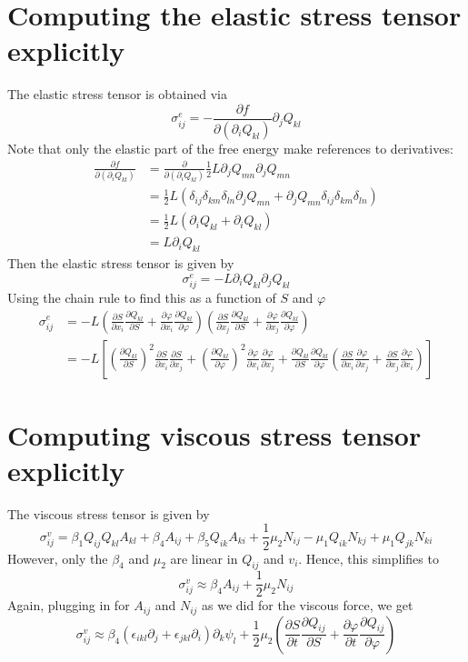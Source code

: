 \documentclass[leqno]{article}
\begin{document}
	\section*{Computing the elastic stress tensor explicitly}
	The elastic stress tensor is obtained via
	\[
		\sigma^{e}_{ij} = -\frac{\partial f}{\partial (\partial_i Q_{kl})} \partial_j Q_{kl}
	\]
	Note that only the elastic part of the free energy make references to derivatives:
	\begin{align*}
		\frac{\partial f}{\partial (\partial_i Q_{kl})} &= \frac{\partial}{\partial (\partial_i Q_{kl})} \frac{1}{2} L \partial_j Q_{mn} \partial_j Q_{mn} \\
		&= \frac{1}{2} L (\delta_{ij}\delta_{km}\delta_{ln} \partial_j Q_{mn} + \partial_j Q_{mn} \delta_{ij}\delta_{km}\delta_{ln}) \\
		&= \frac{1}{2} L (\partial_i Q_{kl} + \partial_i Q_{kl}) \\
		&= L\partial_i Q_{kl}
	\end{align*}
	Then the elastic stress tensor is given by
	\[
		\sigma^e_{ij} = -L\partial_i Q_{kl} \partial_j Q_{kl}
	\]
	Using the chain rule to find this as a function of $S$ and $\varphi$
	\begin{align*}
		\sigma^e_{ij} &= -L \left( \frac{\partial S}{\partial x_i} \frac{\partial Q_{kl}}{\partial S} + \frac{\partial \varphi}{\partial x_i} \frac{\partial Q_{kl}}{\partial \varphi} \right) \left( \frac{\partial S}{\partial x_j} \frac{\partial Q_{kl}}{\partial S} + \frac{\partial \varphi}{\partial x_j} \frac{\partial Q_{kl}}{\partial \varphi} \right) \\
		&= -L \left[ \left( \frac{\partial Q_{kl}}{\partial S} \right)^2 \frac{\partial S}{\partial x_i}\frac{\partial S}{\partial x_j} + \left( \frac{\partial Q_{kl}}{\partial \varphi} \right)^2 \frac{\partial \varphi}{\partial x_i}\frac{\partial \varphi}{\partial x_j} + \frac{\partial Q_{kl}}{\partial S} \frac{\partial Q_{kl}}{\partial \varphi}\left( \frac{\partial S}{\partial x_i} \frac{\partial \varphi}{\partial x_j} + \frac{\partial S}{\partial x_j} \frac{\partial \varphi}{\partial x_i} \right) \right]
	\end{align*}
	
	\section*{Computing viscous stress tensor explicitly}
	The viscous stress tensor is given by
	\[
		\sigma^v_{ij} = \beta_1 Q_{ij}Q_{kl}A_{kl} + \beta_4 A_{ij} + \beta_5 Q_{ik} A_{ki} + \frac{1}{2} \mu_2 N_{ij} - \mu_1 Q_{ik}N_{kj} + \mu_1 Q_{jk}N_{ki}
	\]
	However, only the $\beta_4$ and $\mu_2$ are linear in $Q_{ij}$ and $v_i$. Hence, this simplifies to
	\[
		\sigma^v_{ij} \approx \beta_4 A_{ij} + \frac{1}{2} \mu_2 N_{ij}
	\]
	Again, plugging in for $A_{ij}$ and $N_{ij}$ as we did for the viscous force, we get
	\[
		\sigma^v_{ij} \approx \beta_4 (\epsilon_{ikl} \partial_j + \epsilon_{jkl} \partial_i)\partial_k \psi_l + \frac{1}{2} \mu_2  \left( \frac{\partial S}{\partial t} \frac{\partial Q_{ij}}{\partial S} + \frac{\partial \varphi}{\partial t} \frac{\partial Q_{ij}}{\partial \varphi} \right)
	\]
\end{document}
